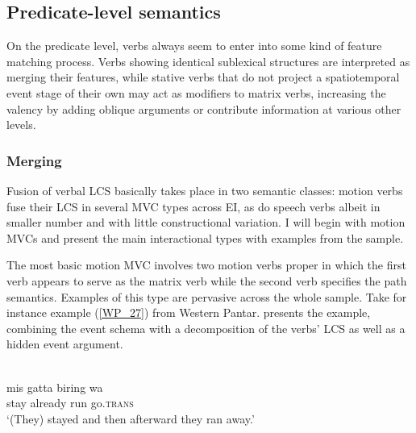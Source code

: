 \subsection{Predicate-level semantics} \label{sec:predicate-level}

On the predicate level, verbs always seem to enter into some kind of feature matching process. Verbs showing identical sublexical structures are interpreted as merging their features, while stative verbs that do not project a spatiotemporal event stage of their own may act as modifiers to matrix verbs, increasing the valency by adding oblique arguments or contribute information at various other levels.

\subsubsection{Merging}
\label{sec:merging}

Fusion of verbal LCS basically takes place in two semantic classes: motion verbs fuse their LCS in several MVC types across EI, as do speech verbs albeit in smaller number and with little constructional variation. I will begin with motion MVCs and present the main interactional types with examples from the sample.

The most basic motion MVC involves two motion verbs proper in which the first verb appears to serve as the matrix verb while the second verb specifies the path semantics. Examples of this type are pervasive across the whole sample. Take for instance example (\ref{WP_27}) from Western Pantar.  presents the example, combining the event schema with a decomposition of the verbs' LCS as well as a hidden event argument.

\ea \label{WP_27}
\\
\gll mis gatta biring wa \\
stay already run go.\textsc{trans} \\
\glft `(They) stayed and then afterward they ran away.' \\ 
\z

